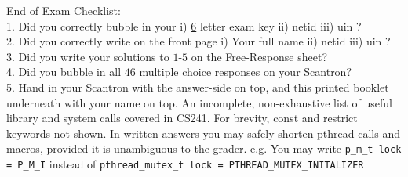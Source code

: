 \cleardoublepage
\bigskip
\noindent
\textbf
\Large
End of Exam Checklist: \\
1. Did you correctly bubble in your i) {\underline 6 letter exam key}  ii)  netid   iii) uin ? \\
2. Did you correctly write on the front page i) Your full name  ii)  netid   iii) uin ? \\
3. Did you write your solutions to $1$-$5$ on the Free-Response sheet?\\
4. Did you bubble in all $46$ multiple choice responses on your Scantron? \\
5. Hand in your Scantron with the answer-side on top, and this printed booklet underneath with your name on top.
\zone
\cleardoublepage
An incomplete, non-exhaustive list of useful library and system calls covered in CS241.
For brevity, const and restrict keywords not shown. 
In written answers you may safely shorten pthread calls and macros, 
provided it is unambiguous to the grader. 
e.g. You may write {\tt p_m_t lock = P_M_I} instead of {\tt pthread_mutex_t lock = PTHREAD_MUTEX_INITALIZER}
\small

